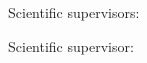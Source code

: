 \vspace{0pt plus4fill} %
\begin{flushright}
\ifdefined\supervisorTwoFio
Scientific supervisors:

\supervisorRegalia

\ifdefined\supervisorDead
\framebox{\supervisorFio}
\else
\supervisorFio
\fi

\supervisorTwoRegalia

\ifdefined\supervisorTwoDead
\framebox{\supervisorTwoFio}
\else
\supervisorFio
\fi
\else
Scientific supervisor:

\supervisorRegalia

\ifdefined\supervisorDead
\framebox{\supervisorFio}
\else
\supervisorFio
\fi
\fi

\end{flushright}
%
\vspace{0pt plus4fill} %
{\centering\thesisCity\

\thesisYear\par}

